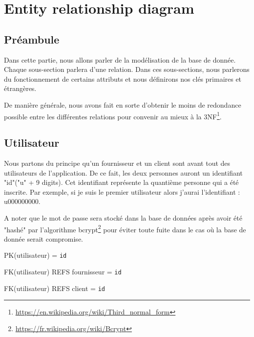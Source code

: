 \section{Entity relationship diagram}
\subsection{Préambule}
\begin{flushleft}
Dans cette partie, nous allons parler de la modélisation de la base de donnée. Chaque sous-section parlera d'une relation. Dans ces sous-sections, nous parlerons du fonctionnement de certains attributs et nous définirons nos clés primaires et étrangères.
\end{flushleft}

\begin{flushleft}
De manière générale, nous avons fait en sorte d'obtenir le moins de redondance possible entre les différentes relations pour convenir au mieux à la 3NF\footnote{ \url{https://en.wikipedia.org/wiki/Third\_normal\_form}}.
\end{flushleft}
\subsection{Utilisateur}
\begin{flushleft}
Nous partons du principe qu'un fournisseur et un client sont avant tout des utilisateurs de l'application. De ce fait, les deux personnes auront un identifiant "id"("u" + 9 digits). Cet identifiant représente la quantième personne qui a été inscrite. Par exemple, si je suis le premier utilisateur alors j'aurai l'identifiant : u000000000.
\end{flushleft}

\begin{flushleft}
A noter que le mot de passe sera stocké dans la base de données après avoir été "hashé" par l'algorithme bcrypt\footnote{\url{https://fr.wikipedia.org/wiki/Bcrypt}} pour éviter toute fuite dans le cas où la base de donnée serait compromise.
\end{flushleft}

\begin{flushleft}
PK(utilisateur) = \texttt{id}
\end{flushleft}

\begin{flushleft}
FK(utilisateur) REFS fournisseur = \texttt{id}

FK(utilisateur) REFS client = \texttt{id}
\end{flushleft}
\newpage
